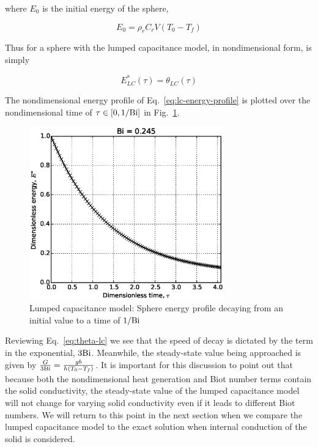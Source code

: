 where $E_0$ is the initial energy of the sphere,

\begin{equation}
    E_0=\rho_rC_rV(T_0-T_f)
\end{equation}

Thus for a sphere with the lumped capacitance model, in nondimensional form, is simply

\begin{equation}\label{eq:lc-energy-profile}
	E^*_{LC}(\tau) = \theta_{LC}(\tau)
\end{equation}

The nondimensional energy profile of Eq.~\ref{eq:lc-energy-profile} is plotted over the nondimensional time of $\tau \in [0,1/\mathrm{Bi}]$ in Fig.~\ref{fig:LC-sphere-in-fluid}. 

\begin{figure}[ht]
	\centering
		\includegraphics[width=0.75\textwidth]{chapters/figures/LC-sphere-in-fluid}
	\caption[Lumped Capacitance energy profile]{Lumped capacitance model: Sphere energy profile decaying from an initial value to a time of $1/\mathrm{Bi}$}
	\label{fig:LC-sphere-in-fluid}
\end{figure}

Reviewing Eq.~\ref{eq:theta-lc} we see that the speed of decay is dictated by the term in the exponential, $3\mathrm{Bi}$. Meanwhile, the steady-state value being approached is given by $\frac{G}{3\mathrm{Bi}} = \frac{gb}{h(T_0 - T_f)}$. It is important for this discussion to point out that because both the nondimensional heat generation and Biot number terms contain the solid conductivity, the steady-state value of the lumped capacitance model will not change for varying solid conductivity even if it leads to different Biot numbers. We will return to this point in the next section when we compare the lumped capacitance model to the exact solution when internal conduction of the solid is considered.



